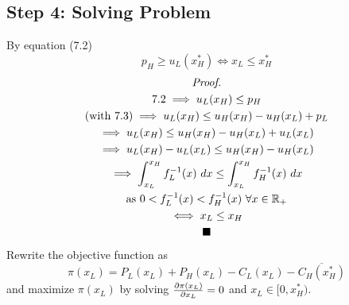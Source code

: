 \documentclass[11pt]{article}
\begin{document}
	\subsection{Step 4: Solving Problem}
		By equation (7.2)
		\begin{equation}
			p_H \geq u_L(x_H^*) \iff x_L \leq x_H^*
		\end{equation}
		\begin{multline*}
			\emph{Proof.} \\
			7.2 \implies u_L(x_H) \leq p_H \\
			\text{{(with 7.3)}} \implies u_L(x_H) \leq u_H(x_H) - u_H(x_L) + p_L \\
			\implies u_L(x_H) \leq u_H(x_H) - u_H(x_L) + u_L(x_L) \\
			\implies u_L(x_H) - u_L(x_L) \leq u_H(x_H) - u_H(x_L) \\
			\implies \int_{x_L}^{x_H} f_L^{-1}(x)\ dx \leq \int_{x_L}^{x_H} f_H^{-1}(x)\ dx \\
			\text{{as }} 0 < f_L^{-1}(x) < f_H^{-1}(x) \ \forall x \in \mathbb{R}_+ \\
			\iff x_L \leq x_H \\
			\blacksquare
		\end{multline*}
		Rewrite the objective function as 
		\begin{equation}
			\pi(x_L) = P_L(x_L) + P_H(x_L) - C_L(x_L) - \overline{C_H(x_H^*)}
		\end{equation}
		and maximize $\pi(x_L)$ by solving $\frac{\partial{\pi(x_L)}}{\partial{x_L}} = 0$ and $x_L \in [0, x_H^*)$.
\end{document}
